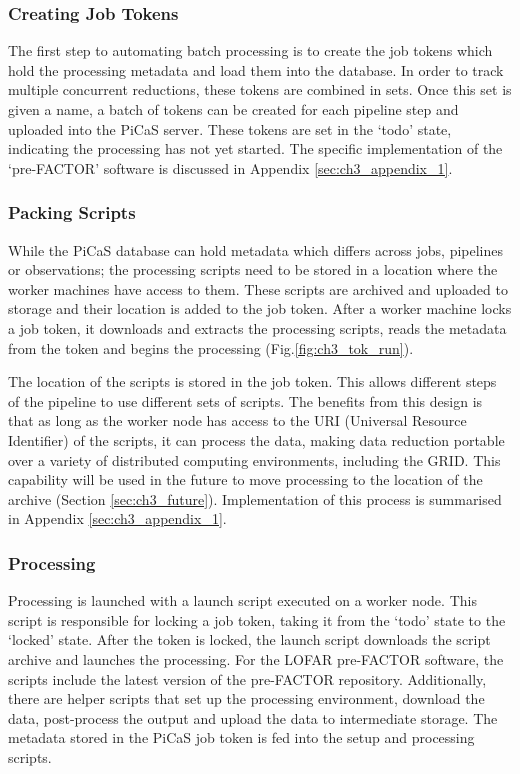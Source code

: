 \subsubsection{Creating Job Tokens}\label{sec:ch3_create_tokens}

The first step to automating batch processing is to create the job tokens which hold the processing metadata and load them into the database. In order to track multiple concurrent reductions, these tokens are combined in sets. Once this set is given a name, a batch of tokens can be created for each pipeline step and uploaded into the PiCaS server. These tokens are set in the `todo' state, indicating the processing has not yet started. The specific implementation of the `pre-FACTOR' software is discussed in Appendix \ref{sec:ch3_appendix_1}.


\subsubsection{Packing Scripts}\label{sect:ch3_scripts}

While the PiCaS database can hold metadata which differs across jobs, pipelines or observations; the processing scripts need to be stored in a location where the worker machines have access to them. These scripts are archived and uploaded to storage and their location is added to the job token. After a worker machine locks a job token, it downloads and extracts the processing scripts, reads the metadata from the token and begins the processing (Fig.\ref{fig:ch3_tok_run}).

The location of the scripts is stored in the job token. This allows different steps of the pipeline to use different sets of scripts. The benefits from this design is that as long as the worker node has access to the URI (Universal Resource Identifier) of the scripts, it can process the data, making data reduction portable over a variety of distributed computing environments, including the GRID. This capability will be used in the future to move processing to the location of the archive (Section \ref{sec:ch3_future}). Implementation of this process is summarised in Appendix \ref{sec:ch3_appendix_1}. 


\subsubsection{Processing}

Processing is launched with a launch script executed on a worker node. This script is responsible for locking a job token, taking it from the `todo' state to the `locked' state. After the token is locked, the launch script downloads the script archive and launches the processing. For the LOFAR pre-FACTOR software, the scripts include the latest version of the pre-FACTOR repository. Additionally, there are helper scripts that set up the processing environment, download the data, post-process the output and upload the data to intermediate storage. The metadata stored in the PiCaS job token is fed into the setup and processing scripts. 

